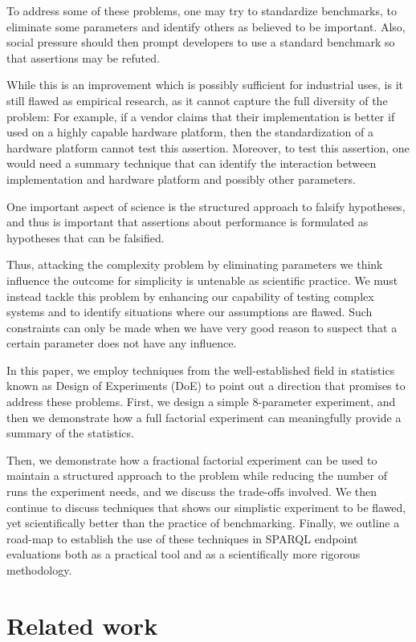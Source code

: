 \documentclass{article}
\begin{document}
To address some of these problems, one may try to standardize
benchmarks, to eliminate some parameters and identify others as
believed to be important. Also, social pressure should then prompt
developers to use a standard benchmark so that assertions may be
refuted.

While this is an improvement which is possibly sufficient for
industrial uses, is it still flawed as empirical
research, as it cannot capture the full diversity of the problem: For
example, if a vendor claims that their implementation is better if
used on a highly capable hardware platform, then the standardization
of a hardware platform cannot test this assertion. Moreover, to test
this assertion, one would need a summary technique that can identify
the interaction between implementation and hardware platform and
possibly other parameters.

One important aspect of science is the structured approach to falsify
hypotheses, and thus is important that assertions about performance is
formulated as hypotheses that can be falsified.

Thus, attacking the complexity problem by eliminating parameters we
think influence the outcome for simplicity is untenable as
scientific practice. We must instead tackle this problem by enhancing
our capability of testing complex systems and to identify situations
where our assumptions are flawed. Such constraints can only be made
when we have very good reason to suspect that a certain parameter does
not have any influence.

In this paper, we employ techniques from the well-established field in
statistics known as Design of Experiments (DoE) to point out a
direction that promises to address these problems. First, we design a
simple 8-parameter experiment, and then we demonstrate how a full
factorial experiment can meaningfully provide a summary of the
statistics.

Then, we demonstrate how a fractional factorial experiment can be used
to maintain a structured approach to the problem while reducing the
number of runs the experiment needs, and we discuss the trade-offs
involved. We then continue to discuss techniques that shows our
simplistic experiment to be flawed, yet scientifically better than the
practice of benchmarking. Finally, we outline a road-map to establish
the use of these techniques in SPARQL endpoint evaluations both as a
practical tool and as a scientifically more rigorous methodology.

\section{Related work}
\end{document}
